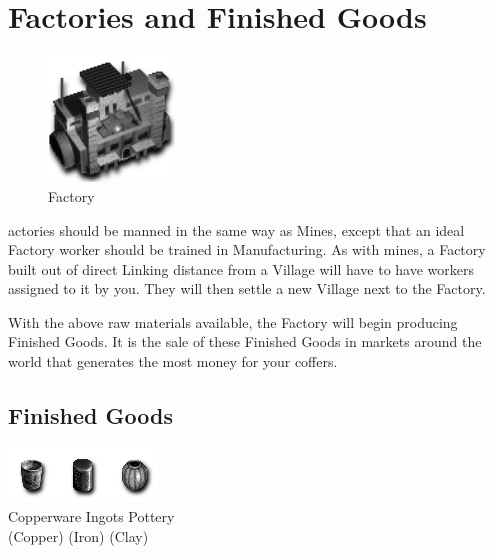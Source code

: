 
\section{\textsf{Factories and Finished Goods}}

\begin{figure}
    \vspace{-20pt}
    \begin{center}
        \includegraphics[width=0.3\textwidth]{Ifactory}
        \\ Factory
    \end{center}
    \vspace{-20pt}
\end{figure}


actories should be manned in the same way as Mines, except that an ideal Factory worker should be trained in Manufacturing. As with mines, a Factory built out of direct Linking distance from a Village will have to have workers assigned to it by you. They will then settle a new Village next to the Factory.

With the above raw materials available, the Factory will begin producing Finished Goods. It is the sale of these Finished Goods in markets around the world that generates the most money for your coffers.

\subsection{\textsf{Finished Goods}}


\begin{center}
    \includegraphics[width=0.5\linewidth]{Igoods} %
    \\ Copperware Ingots Pottery
    \\ (Copper) (Iron) (Clay)
\end{center}

